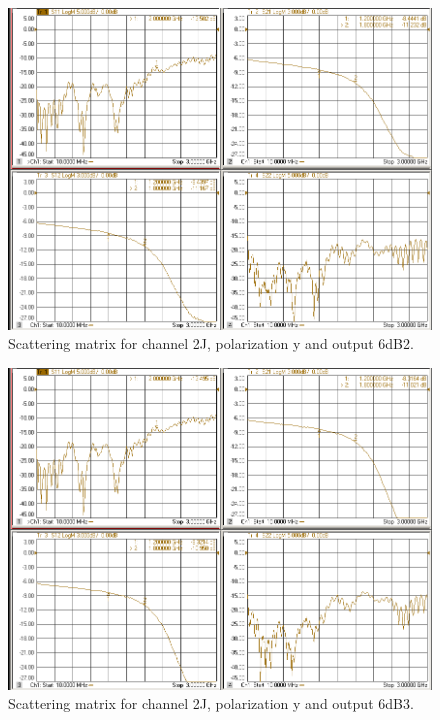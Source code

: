 \documentclass[12pt,a4paper,oneside]{article}
\begin{document}
\begin{figure}[H]
\centering
\includegraphics[width=0.9\linewidth]{VNA_results/2Jy_6dB2.png}
\caption{Scattering matrix for channel 2J, polarization y and output 6dB2.}
\label{fig:2Jy_6dB2}
\end{figure}


\begin{figure}[H]
\centering
\includegraphics[width=0.9\linewidth]{VNA_results/2Jy_6dB3.png}
\caption{Scattering matrix for channel 2J, polarization y and output 6dB3.}
\label{fig:2Jy_6dB3}
\end{figure}
\end{document}
